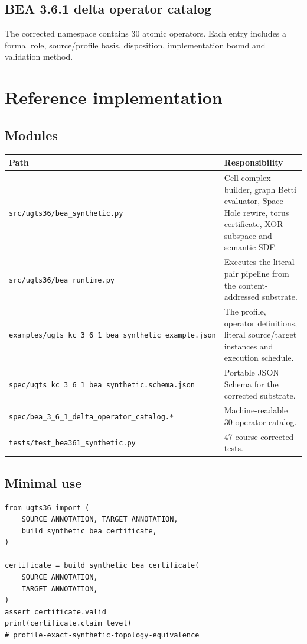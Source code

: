 \documentclass[10pt,a4paper]{article}
\newcommand{\code}[1]{\texttt{#1}}
\begin{document}
\clearpage
\begin{landscape}
\section{BEA 3.6.1 delta operator catalog}
The corrected namespace contains 30 atomic operators. Each entry includes a formal role, source/profile basis, disposition, implementation bound and validation method.


\end{landscape}
\clearpage

\section{Reference implementation}

\subsection{Modules}
\begin{tabularx}{\textwidth}{lX}
\toprule
\textbf{Path} & \textbf{Responsibility}\\
\midrule
\code{src/ugts36/bea\_synthetic.py} & Cell-complex builder, graph Betti evaluator, Space-Hole rewire, torus certificate, XOR subspace and semantic SDF.\\
\code{src/ugts36/bea\_runtime.py} & Executes the literal pair pipeline from the content-addressed substrate.\\
\code{examples/ugts\_kc\_3\_6\_1\_bea\_synthetic\_example.json} & The profile, operator definitions, literal source/target instances and execution schedule.\\
\code{spec/ugts\_kc\_3\_6\_1\_bea\_synthetic.schema.json} & Portable JSON Schema for the corrected substrate.\\
\code{spec/bea\_3\_6\_1\_delta\_operator\_catalog.*} & Machine-readable 30-operator catalog.\\
\code{tests/test\_bea361\_synthetic.py} & 47 course-corrected tests.\\
\bottomrule
\end{tabularx}

\subsection{Minimal use}
\begin{Verbatim}[breaklines=true,fontsize=\small]
from ugts36 import (
    SOURCE_ANNOTATION, TARGET_ANNOTATION,
    build_synthetic_bea_certificate,
)

certificate = build_synthetic_bea_certificate(
    SOURCE_ANNOTATION,
    TARGET_ANNOTATION,
)
assert certificate.valid
print(certificate.claim_level)
# profile-exact-synthetic-topology-equivalence
\end{Verbatim}
\end{document}
